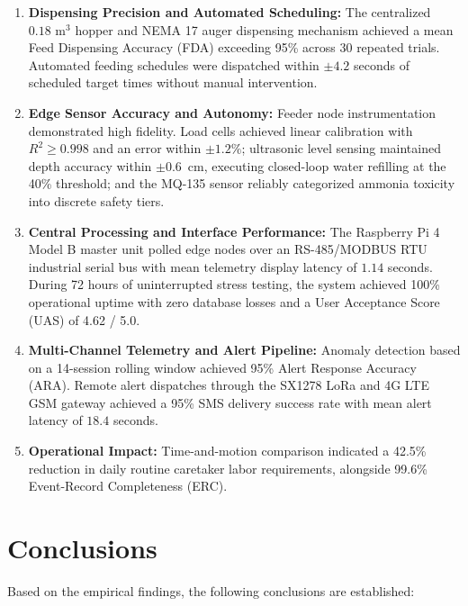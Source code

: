 \begin{enumerate}[label=\arabic*.]
    \item \textbf{Dispensing Precision and Automated Scheduling:} The centralized $0.18\text{ m}^3$ hopper and NEMA 17 auger dispensing mechanism achieved a mean Feed Dispensing Accuracy (FDA) exceeding 95\% across 30 repeated trials. Automated feeding schedules were dispatched within $\pm 4.2$ seconds of scheduled target times without manual intervention.
    
    \item \textbf{Edge Sensor Accuracy and Autonomy:} Feeder node instrumentation demonstrated high fidelity. Load cells achieved linear calibration with $R^2 \geq 0.998$ and an error within $\pm 1.2\%$; ultrasonic level sensing maintained depth accuracy within $\pm 0.6$~cm, executing closed-loop water refilling at the 40\% threshold; and the MQ-135 sensor reliably categorized ammonia toxicity into discrete safety tiers.
    
    \item \textbf{Central Processing and Interface Performance:} The Raspberry Pi 4 Model B master unit polled edge nodes over an RS-485/MODBUS RTU industrial serial bus with mean telemetry display latency of $1.14$ seconds. During 72 hours of uninterrupted stress testing, the system achieved 100\% operational uptime with zero database losses and a User Acceptance Score (UAS) of 4.62 / 5.0.
    
    \item \textbf{Multi-Channel Telemetry and Alert Pipeline:} Anomaly detection based on a 14-session rolling window achieved 95\% Alert Response Accuracy (ARA). Remote alert dispatches through the SX1278 LoRa and 4G LTE GSM gateway achieved a 95\% SMS delivery success rate with mean alert latency of $18.4$ seconds.
    
    \item \textbf{Operational Impact:} Time-and-motion comparison indicated a 42.5\% reduction in daily routine caretaker labor requirements, alongside 99.6\% Event-Record Completeness (ERC).
\end{enumerate}

\section{Conclusions}

Based on the empirical findings, the following conclusions are established:

